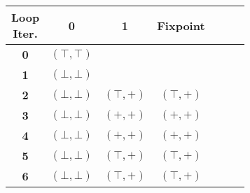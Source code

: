 \documentclass{article}
\begin{document}
\small

\begin{tabular}{*{7}{c}}
  \toprule
  \backslashbox{Lab.}{Loop\\Iter.} & 0 & 1 & Fixpoint  \\
  \midrule
  \textbf{0} & $(\top,\top)$ &  &  \\ \hline

  \textbf{1} & $(\bot,\bot)$ &  &  \\ \hline

  \textbf{2} & $(\bot,\bot)$ & $(\top,+)$    & $(\top,+)$     \\ \hline

  \textbf{3} & $(\bot,\bot)$ & $(+,+)$    & $(+,+)$  \\ \hline

  \textbf{4} & $(\bot,\bot)$ & $(+,+)$    & $(+,+)$ \\ \hline

  \textbf{5} & $(\bot,\bot)$ & $(\top,+)$ & $(\top, +)$ \\ \hline

  \textbf{6} & $(\bot,\bot)$ & $(\top,+)$ & $(\top, +)$ \\

  \bottomrule
\end{tabular}
\end{document}
